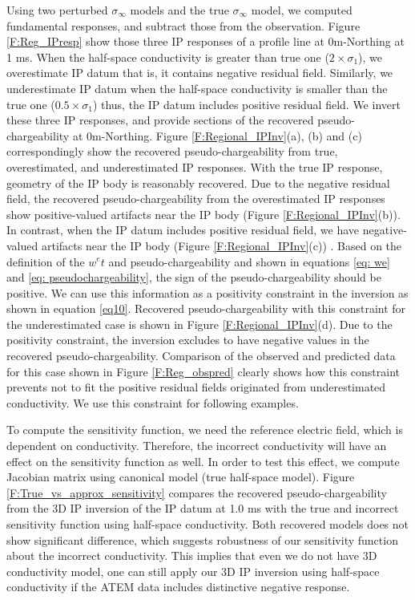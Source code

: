 \documentclass[a4paper, 11pt]{article}
\newcommand{\siginf}{\sigma_\infty}
\begin{document}
Using two perturbed $\siginf$ models and the true $\siginf$ model, we computed fundamental responses, and subtract those from the observation. 
Figure \ref{F:Reg_IPresp} show those three IP responses of a profile line at 0m-Northing at 1 ms.  
When the half-space conductivity is greater than true one ($2\times\sigma_1$), we overestimate IP datum that is, it contains negative residual field. 
Similarly, we underestimate IP datum when the half-space conductivity is smaller than the true one ($0.5\times\sigma_1$) thus, the IP datum includes positive residual field.
We invert these three IP responses, and provide sections of the recovered pseudo-chargeability at 0m-Northing. 
Figure \ref{F:Regional_IPInv}(a), (b) and (c) correspondingly show the recovered pseudo-chargeability from true, overestimated, and underestimated IP responses. 
With the true IP response, geometry of the IP body is reasonably recovered. 
Due to the negative residual field, the recovered pseudo-chargeability from the overestimated IP responses show positive-valued artifacts near the IP body (Figure \ref{F:Regional_IPInv}(b)). 
In contrast, when the IP datum includes positive residual field, we have negative-valued artifacts near the IP body (Figure \ref{F:Regional_IPInv}(c)) . 
Based on the definition of the  $w^e{t}$ and pseudo-chargeability and shown in equations \ref{eq: we} and \ref{eq: pseudochargeability}, the sign of the pseudo-chargeability should be positive. 
We can use this information as a positivity constraint in the inversion as shown in equation \ref{eq10}. 
Recovered pseudo-chargeability with this constraint for the underestimated case is shown in Figure \ref{F:Regional_IPInv}(d). 
Due to the positivity constraint, the inversion excludes to have negative values in the recovered pseudo-chargeability. 
Comparison of the observed and predicted data for this case shown in Figure \ref{F:Reg_obspred} clearly shows how this constraint prevents not to fit the positive residual fields originated from underestimated conductivity. 
We use this constraint for following examples. 

To compute the sensitivity function, we need the reference electric field, which is dependent on conductivity. 
Therefore, the incorrect conductivity will have an effect on the sensitivity function as well. 
In order to test this effect, we compute Jacobian matrix using canonical model (true half-space model). 
Figure \ref{F:True_vs_approx_sensitivity} compares the recovered pseudo-chargeability from the 3D IP inversion of the IP datum at 1.0 ms with the true and incorrect sensitivity function using half-space conductivity. 
Both recovered models does not show significant difference, which suggests robustness of our sensitivity function about the incorrect conductivity. 
This implies that even we do not have 3D conductivity model, one can still apply our 3D IP inversion using half-space conductivity if the ATEM data includes distinctive negative response. 
\end{document}
